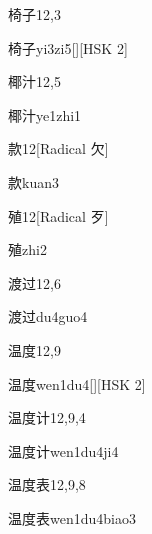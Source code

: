 \begin{entry}{椅子}{12,3}
  \begin{phonetics}{椅子}{yi3zi5}[][HSK 2]
  \end{phonetics}
\end{entry}

\begin{entry}{椰汁}{12,5}
  \begin{phonetics}{椰汁}{ye1zhi1}
  \end{phonetics}
\end{entry}

\begin{entry}{款}{12}[Radical 欠]
  \begin{phonetics}{款}{kuan3}
  \end{phonetics}
\end{entry}

\begin{entry}{殖}{12}[Radical 歹]
  \begin{phonetics}{殖}{zhi2}
  \end{phonetics}
\end{entry}

\begin{entry}{渡过}{12,6}
  \begin{phonetics}{渡过}{du4guo4}
  \end{phonetics}
\end{entry}

\begin{entry}{温度}{12,9}
  \begin{phonetics}{温度}{wen1du4}[][HSK 2]
  \end{phonetics}
\end{entry}

\begin{entry}{温度计}{12,9,4}
  \begin{phonetics}{温度计}{wen1du4ji4}
  \end{phonetics}
\end{entry}

\begin{entry}{温度表}{12,9,8}
  \begin{phonetics}{温度表}{wen1du4biao3}
  \end{phonetics}
\end{entry}

